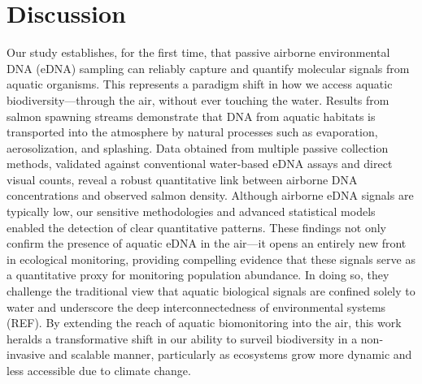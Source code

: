 \documentclass{article}
\begin{document}
\section{Discussion}
Our study establishes, for the first time, that passive airborne environmental DNA (eDNA) sampling can reliably capture and quantify molecular signals from aquatic organisms. This represents a paradigm shift in how we access aquatic biodiversity—through the air, without ever touching the water. Results from salmon spawning streams demonstrate that DNA from aquatic habitats is transported into the atmosphere by natural processes such as evaporation, aerosolization, and splashing. Data obtained from multiple passive collection methods, validated against conventional water-based eDNA assays and direct visual counts, reveal a robust quantitative link between airborne DNA concentrations and observed salmon density. Although airborne eDNA signals are typically low, our sensitive methodologies and advanced statistical models enabled the detection of clear quantitative patterns. These findings not only confirm the presence of aquatic eDNA in the air—it opens an entirely new front in ecological monitoring, providing compelling evidence that these signals serve as a quantitative proxy for monitoring population abundance. In doing so, they challenge the traditional view that aquatic biological signals are confined solely to water and underscore the deep interconnectedness of environmental systems (REF). By extending the reach of aquatic biomonitoring into the air, this work heralds a transformative shift in our ability to surveil biodiversity in a non-invasive and scalable manner, particularly as ecosystems grow more dynamic and less accessible due to climate change.
\end{document}
